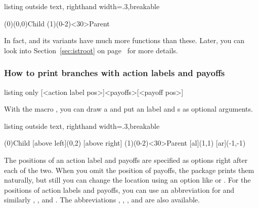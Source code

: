 \begin{tcblisting}{listing outside text, righthand width=.3\linewidth,breakable}
\begin{istgame}
\xtdistance{15mm}{30mm}
\istroot(0)(0,0){Child}
  \istb%
  \istb%
  \endist
\istroot(1)(0-2)<30>{Parent}
  \istb%
  \istb%
  \endist 
\end{istgame}
\end{tcblisting}

In fact, \cmd{\istroot} and its variants have much more functions than these. Later, you can look into Section~\ref{sec:istroot} on page~\pageref{sec:istroot} for more details.

\subsubsection{How to print branches with action labels and payoffs}

\begin{tcblisting}{listing only}
[<action label pos>]{<payoffs>}[<payoff pos>]
\end{tcblisting}

With the macro \icmd{\istb}, you can draw a \emph{} and put an \emph{} label and \emph{}s as optional arguments.

\begin{tcblisting}{listing outside text, righthand width=.3\linewidth,breakable}
\begin{istgame}
\xtdistance{15mm}{30mm}
\istroot(0){Child}
  [above left]{(0,2)}
  [above right]
  \endist
\istroot(1)(0-2)<30>{Parent}
  [al]{(1,1)}
  [ar]{(-1,-1)}
  \endist 
\end{istgame}
\end{tcblisting}

The positions of an action label and payoffs are specified as options right after each of the two.
When you omit the position of payoffs, the package prints them naturally, but still you can change the location using an option like \xw{[left]} or . For the positions of action labels and payoffs, you can use an abbreviation \xw{[al]} for  and similarly \xw{[ar]}, \xw{[bl]}, and \xw{[br]}.
The abbreviations \xw{[a]}, \xw{[b]}, \xw{[l]}, and \xw{[r]} are also available.

